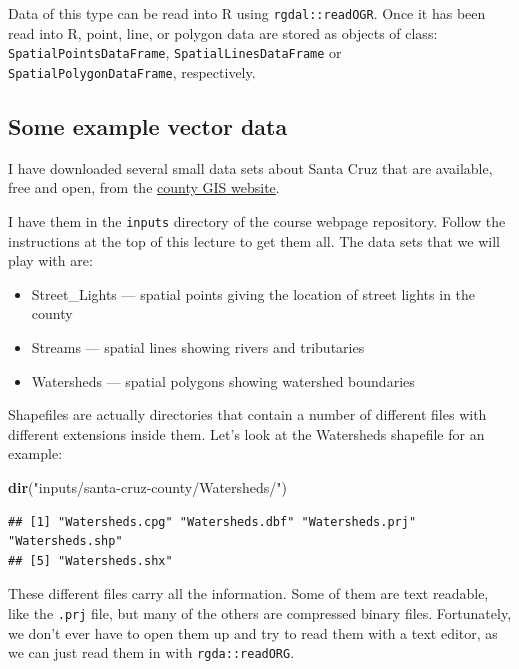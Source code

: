 \documentclass[]{book}
\newenvironment{Shaded}{\begin{snugshade}}{\end{snugshade}}
\newcommand{\KeywordTok}[1]{\textcolor[rgb]{0.13,0.29,0.53}{\textbf{{#1}}}}
\newcommand{\StringTok}[1]{\textcolor[rgb]{0.31,0.60,0.02}{{#1}}}
\newcommand{\NormalTok}[1]{{#1}}
\providecommand{\tightlist}{%
  \setlength{\itemsep}{0pt}\setlength{\parskip}{0pt}}
\theoremstyle{definition}
\theoremstyle{definition}
\theoremstyle{remark}
\begin{document}
Data of this type can be read into R using \texttt{rgdal::readOGR}. Once
it has been read into R, point, line, or polygon data are stored as
objects of class: \texttt{SpatialPointsDataFrame},
\texttt{SpatialLinesDataFrame} or \texttt{SpatialPolygonDataFrame},
respectively.

\subsection{Some example vector data}\label{some-example-vector-data}

I have downloaded several small data sets about Santa Cruz that are
available, free and open, from the
\href{http://www.co.santa-cruz.ca.us/Departments/GeographicInformationSystems(GIS).aspx}{county
GIS website}.

I have them in the \texttt{inputs} directory of the course webpage
repository. Follow the instructions at the top of this lecture to get
them all. The data sets that we will play with are:

\begin{itemize}
\tightlist
\item
  Street\_Lights --- spatial points giving the location of street lights
  in the county
\item
  Streams --- spatial lines showing rivers and tributaries
\item
  Watersheds --- spatial polygons showing watershed boundaries
\end{itemize}

Shapefiles are actually directories that contain a number of different
files with different extensions inside them. Let's look at the
Watersheds shapefile for an example:

\begin{Shaded}
\begin{Highlighting}[]
\KeywordTok{dir}\NormalTok{(}\StringTok{"inputs/santa-cruz-county/Watersheds/"}\NormalTok{)}
\end{Highlighting}
\end{Shaded}

\begin{verbatim}
## [1] "Watersheds.cpg" "Watersheds.dbf" "Watersheds.prj" "Watersheds.shp"
## [5] "Watersheds.shx"
\end{verbatim}

These different files carry all the information. Some of them are text
readable, like the \texttt{.prj} file, but many of the others are
compressed binary files. Fortunately, we don't ever have to open them up
and try to read them with a text editor, as we can just read them in
with \texttt{rgda::readORG}.
\end{document}
